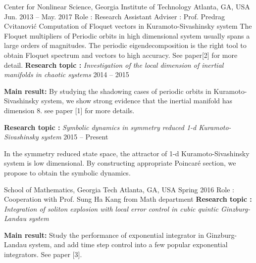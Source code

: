 


\begin{cventries}

\cvresearch
{Center for Nonlinear Science, Georgia Institute of Technology}
{Atlanta, GA, USA}
{Jun. 2013 -- May. 2017}
{Role : Research Assistant \quad Adviser : Prof. Predrag Cvitanovi\'c }
{
	\cvresearchitem
	{Computation of Floquet vectors in Kuramoto-Sivashinsky system}
	{The Floquet multipliers of Periodic orbits in high dimensional system usually spans a large orders of magnitudes. The periodic eigendecomposition is the right tool to obtain Floquet spectrum and vectors to high accuracy. See paper[2] for more detail.}
}
\cventry
{\textbf{Research topic :} \emph{Investigation of the local dimension of inertial manifolds in chaotic systems}}
{}{}
{2014 -- 2015}
{
  \begin{cvitems}
    \item {\textbf{Main result:} By studying the shadowing cases of periodic orbits in
        Kuramoto-Sivashinsky system, we show strong evidence that the inertial manifold has
        dimension 8. see paper [1] for more details.}
  \end{cvitems}
}

\cventry
{\textbf{Research topic :} \emph{Symbolic dynamics in symmetry reduced 1-d Kuramoto-Sivashinsky system}}
{}{}
{2015 -- Present}
{
  \begin{cvitems}
      \item {In the symmetry reduced state space, the attractor of  1-d Kuramoto-Sivashinsky system
          is low dimensional. By constructing appropriate Poincar\'e section, we propose to obtain the
          symbolic dynamics. }
  \end{cvitems}
}


\cvresearch
{School of Mathematics, Georgia Tech} 
{Atlanta, GA, USA}
{Spring 2016} 
{Role : Cooperation with Prof. Sung Ha Kang from Math department}
	{}
	\cventry
{\textbf{Research topic :} \emph{Integration of soliton explosion with local error control in cubic quintic 
  Ginzburg-Landau system}}
	{}{}{}
{
  \begin{cvitems}
  \item {\textbf{Main result:}  Study the performance of exponential integrator in Ginzburg-Landau system,
      and add time step control into a few popular exponential integrators. See paper [3].}
  \end{cvitems}
}



\end{cventries}
